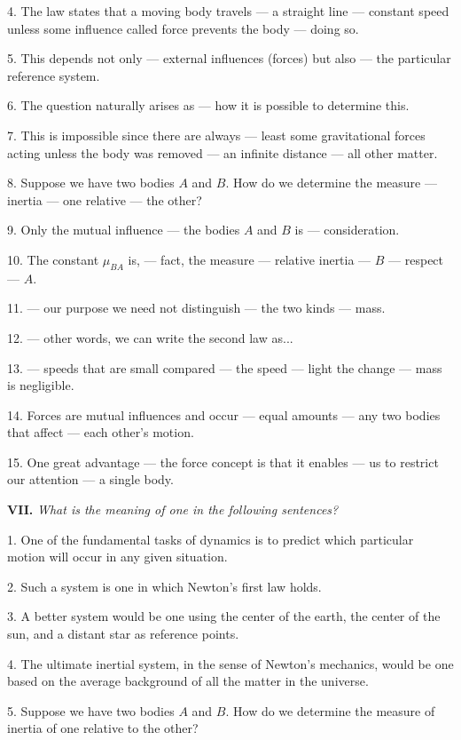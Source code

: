 \documentclass[a4paper]{article}
\newcommand{\ETask}[2]{\medskip\par\textbf{#1.} \textit{#2}\par}
\begin{document}
4. The law states that a moving body travels --- a straight line --- constant speed unless some influence called force
prevents the body --- doing so.

5. This depends not only --- external influences (forces) but also --- the particular reference system.

6. The question naturally arises as --- how it is possible to determine this.

7. This is impossible since there are always --- least some gravitational forces acting unless the body was removed --- an
infinite distance --- all other matter.

8. Suppose we have two bodies $A$ and $B$. How do we determine the measure --- inertia --- one relative --- the other?

9. Only the mutual influence --- the bodies $A$ and $B$ is --- consideration.

10. The constant $\mu_{BA}$ is, --- fact, the measure --- relative inertia --- $B$ --- respect --- $A$.

11. --- our purpose we need not distinguish --- the two kinds --- mass.

12. --- other words, we can write the second law as...

13. --- speeds that are small compared --- the speed --- light the change --- mass is negligible.

14. Forces are mutual influences and occur --- equal amounts --- any two bodies that affect --- each other's motion.

15. One great advantage --- the force concept is that it enables --- us to restrict our attention --- a single body.

\ETask{VII}{What is the meaning of one in the following sentences?}

1. One of the fundamental tasks of dynamics is to predict which particular motion will occur in any given situation.

2. Such a system is one in which Newton's first law holds.

3. A better system would be one using the center of the earth, the center of the sun, and a distant star as reference points.

4. The ultimate inertial system, in the sense of Newton's mechanics, would be one based on the average background of all the
matter in the universe.

5. Suppose we have two bodies $A$ and $B$. How do we determine the measure of inertia of one relative to the other?
\end{document}
